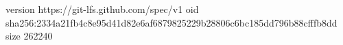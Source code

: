 version https://git-lfs.github.com/spec/v1
oid sha256:2334a21fb4c8e95d41d82e6af6879825229b28806c6bc185dd796b88cfffb8dd
size 262240
